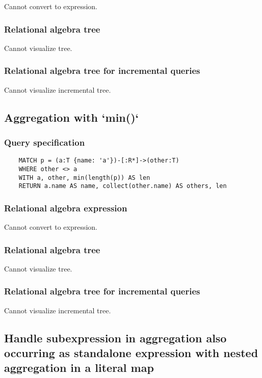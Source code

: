 	Cannot convert to expression.

	\subsubsection*{Relational algebra tree}

	Cannot visualize tree.

	\subsubsection*{Relational algebra tree for incremental queries}

	Cannot visualize incremental tree.
	\subsection{Aggregation with `min()`}

	\subsubsection*{Query specification}

	\begin{lstlisting}
	MATCH p = (a:T {name: 'a'})-[:R*]->(other:T)
	WHERE other <> a
	WITH a, other, min(length(p)) AS len
	RETURN a.name AS name, collect(other.name) AS others, len
	\end{lstlisting}


	\subsubsection*{Relational algebra expression}

	Cannot convert to expression.

	\subsubsection*{Relational algebra tree}

	Cannot visualize tree.

	\subsubsection*{Relational algebra tree for incremental queries}

	Cannot visualize incremental tree.
	\subsection{Handle subexpression in aggregation also occurring as standalone expression with nested aggregation in a literal map}

